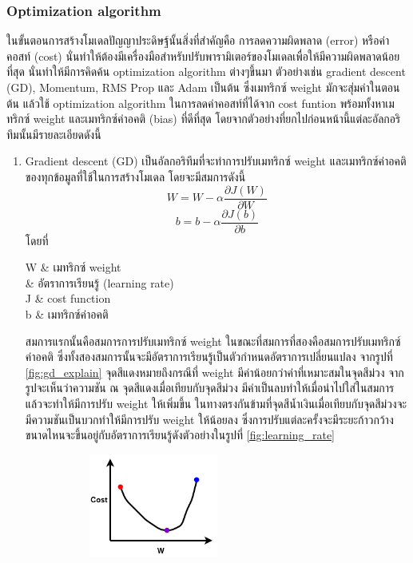 \subsubsection{Optimization algorithm}
ในขั้นตอนการสร้างโมเดลปัญญาประดิษฐ์นั้นสิ่งที่สำคัญคือ การลดความผิดพลาด (error) หรือค่าคอสท์ (cost) นั่นทำให้ต้องมีเครื่องมือสำหรับปรับพารามิเตอร์ของโมเดลเพื่อให้มีความผิดพลาดน้อยที่สุด
นั่นทำให้มีการคิดค้น optimization algorithm ต่างๆขึ้นมา ตัวอย่างเช่น gradient descent (GD), Momentum, RMS Prop และ Adam เป็นต้น
ซึ่งเมทริกซ์ weight มักจะสุ่มค่าในตอนต้น แล้วใช้ optimization algorithm ในการลดค่าคอสท์ที่ได้จาก cost funtion พร้อมทั้งหาเมทริกซ์ weight และเมทริกซ์ค่าอคติ (bias) ที่ดีที่สุด
โดยจากตัวอย่างที่ยกไปก่อนหน้านี้แต่ละอัลกอริทึมนั้นมีรายละเอียดดังนี้
\begin{enumerate}
	\item Gradient descent (GD) เป็นอัลกอริทึมที่จะทำการปรับเมทริกซ์ weight และเมทริกซ์ค่าอคติของทุกข้อมูลที่ใช้ในการสร้างโมเดล โดยจะมีสมการดังนี้
	\begin{equation}
		W = W - \alpha \frac{\partial J(W)}{\partial W}
	\end{equation}
	\begin{equation}
		b = b - \alpha \frac{\partial J(b)}{\partial b}
	\end{equation}
	โดยที่
	\begin{conditions}
		W & เมทริกซ์ weight\\
		\alpha & อัตราการเรียนรู้ (learning rate)\\
		J & cost function\\
		b & เมทริกซ์ค่าอคติ
	\end{conditions}
	สมการแรกนั้นคือสมการการปรับเมทริกซ์ weight ในขณะที่สมการที่สองคือสมการปรับเมทริกซ์ค่าอคติ ซึ่งทั้งสองสมการนั้นจะมีอัตราการเรียนรู้เป็นตัวกำหนดอัตราการเปลี่ยนแปลง จากรูปที่ \ref{fig:gd_explain} จุดสีแดงหมายถึงกรณีที่ weight มีค่าน้อยกว่าค่าที่เหมาะสมในจุดสีม่วง จากรูปจะเห็นว่าความชัน ณ จุดสีแดงเมื่อเทียบกับจุดสีม่วง มีค่าเป็นลบทำให้เมื่อนำไปใส่ในสมการแล้วจะทำให้มีการปรับ weight ให้เพิ่มขึ้น ในทางตรงกันข้ามที่จุดสีน้ำเงินเมื่อเทียบกับจุดสีม่วงจะมีความชันเป็นบวกทำให้มีการปรับ weight ให้น้อยลง  ซึ่งการปรับแต่ละครั้งจะมีระยะก้าวกว้างขนาดไหนจะขึ้นอยู่กับอัตราการเรียนรู้ดังตัวอย่างในรูปที่ \ref{fig:learning_rate}
	\begin{figure}
		\begin{subfigure}[!ht]{0.5\textwidth}
			\centering
			\includegraphics[width=0.5\textwidth]{chapter2/images/gd_explain.png}

\end{subfigure}
\end{figure}
\end{enumerate}
